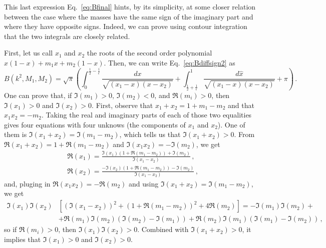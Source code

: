 \documentclass[twoside]{article}
\begin{document}
This last expression Eq.~\eqref{eq:Bfinal} hints, by its simplicity, at some closer relation between the case where the masses have the same sign of the imaginary part and where they have opposite signs. Indeed, we can prove using contour integration that the two integrals are closely related.

First, let us call $x_1$ and $x_2$ the roots of the second order polynomial $x (1-x) + m_1 x + m_2 (1-x)$.
Then, we can write Eq.~\eqref{eq:Bdiffsign2} as
\begin{equation}
B(k^2,M_1,M_2) = \sqrt{\pi}\left(\int_0^{\frac12 - \frac{1}{\epsilon}}  \frac{dx}{\sqrt{(x_1 - x)(x - x_2)}} + \int_{\frac12 + \frac{1}{\epsilon}}^{1}  \frac{d\hat{x}}{\sqrt{(x_1 - x)(x - x_2)}} + \pi \right)\,.
\end{equation}
One can prove that, if $\Im(m_1)>0$, $\Im(m_2)<0$, and $\Re(m_i)>0$, then $\Im(x_1)>0$ and $\Im(x_2)>0$. 
First, observe that $x_1 + x_2 = 1 + m_1 - m_2$ and that $x_1 x_2 = -m_2$. Taking the real and imaginary parts of each of those two equalities gives four equations with four unknows (the components of $x_1$ and $x_2$). One of them is $\Im(x_1 + x_2) = \Im(m_1 - m_2)$, which tells us that $\Im(x_1 + x_2)>0$.
From $\Re(x_1+x_2) = 1 + \Re(m_1-m_2)$ and $\Im(x_1 x_2) = - \Im(m_2)$, we get
\begin{align}
&\Re(x_1) = \frac{\Im(x_1) (1 + \Re(m_1-m_2)) + \Im(m_2)}{\Im(x_1-x_2)} \,,\\
&\Re(x_2) = \frac{-\Im(x_2) (1 + \Re(m_1-m_2)) - \Im(m_2)}{\Im(x_1-x_2)} \,,
\end{align}
and, pluging in $\Re(x_1 x_2) = -\Re(m_2)$ and using $\Im(x_1 + x_2) = \Im(m_1 - m_2)$, we get
\begin{equation}
\begin{split}
\Im(x_1)\Im(x_2) &\left[(\Im(x_1-x_2))^2 + (1 + \Re(m_1-m_2))^2 + 4 \Re(m_2) \right] = -\Im(m_1)\Im(m_2) +\\
& + \Re(m_1) \Im(m_2)(\Im(m_2) - \Im(m_1)) + \Re(m_2) \Im(m_1)(\Im(m_1) - \Im(m_2)) \,,
\end{split}
\end{equation}
so if $\Re(m_i)>0$, then $\Im(x_1)\Im(x_2) > 0$. Combined with $\Im(x_1 + x_2)>0$, it implies that $\Im(x_1)>0$ and $\Im(x_2)>0$.
\end{document}
